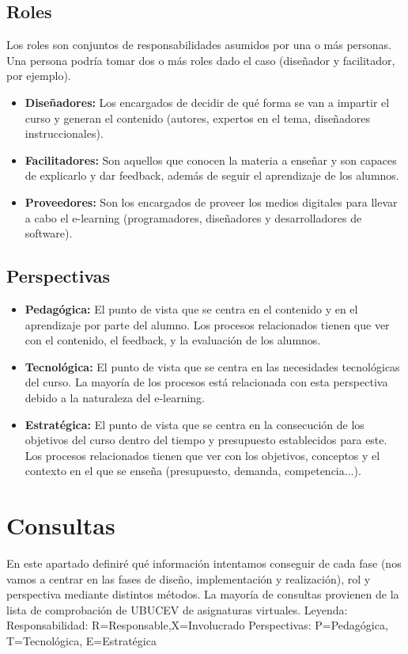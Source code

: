 
\subsection{Roles}
Los roles son conjuntos de responsabilidades asumidos por una o más personas. Una persona podría tomar dos o más roles dado el caso (diseñador y facilitador, por ejemplo).
\begin{itemize}
	\item \textbf{Diseñadores:}
	Los encargados de decidir de qué forma se van a impartir el curso y generan el contenido (autores, expertos en el tema, diseñadores instruccionales).
	\item \textbf{Facilitadores:}
	Son aquellos que conocen la materia a enseñar y son capaces de explicarlo y dar feedback, además de seguir el aprendizaje de los alumnos.
	\item \textbf{Proveedores:}
	Son los encargados de proveer los medios digitales para llevar a cabo el e-learning (programadores, diseñadores y desarrolladores de software).
\end{itemize}


\subsection{Perspectivas}
\begin{itemize}
	\item \textbf{Pedagógica:}
	El punto de vista que se centra en el contenido y en el aprendizaje por parte del alumno. Los procesos relacionados tienen que ver con el contenido, el feedback, y la evaluación de los alumnos.
	\item \textbf{Tecnológica:}
	El punto de vista que se centra en las necesidades tecnológicas del curso. La mayoría de los procesos está relacionada con esta perspectiva debido a la naturaleza del e-learning.
	\item \textbf{Estratégica:}
	El punto de vista que se centra en la consecución de los objetivos del curso dentro del tiempo y presupuesto establecidos para este. Los procesos relacionados tienen que ver con los objetivos, conceptos y el contexto en el que se enseña (presupuesto, demanda, competencia...).
\end{itemize}

\section{Consultas}
En este apartado definiré qué información intentamos conseguir de cada fase (nos vamos a centrar en las fases de diseño, implementación y realización), rol y perspectiva mediante distintos métodos. La mayoría de consultas provienen de la lista de comprobación de UBUCEV de asignaturas virtuales.
Leyenda:
Responsabilidad: R=Responsable,X=Involucrado
Perspectivas: P=Pedagógica, T=Tecnológica, E=Estratégica

